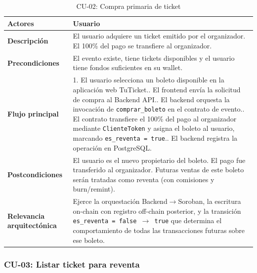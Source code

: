 \documentclass[12pt,oneside]{article}
\begin{document}
\begin{table}[h!]
  \centering
  \begin{tabularx}{\textwidth}{@{}p{3.5cm} X@{}}
    \toprule
    \textbf{Actores} & Usuario\\
    \midrule
    \textbf{Descripción} & El usuario adquiere un ticket emitido por el organizador. El 100\% del pago se transfiere al organizador.\\
    \midrule
    \textbf{Precondiciones} & El evento existe, tiene tickets disponibles y el usuario tiene fondos suficientes en su wallet.\\
    \midrule
    \textbf{Flujo principal} &
      1. El usuario selecciona un boleto disponible en la aplicación web TuTicket.\newline
      2. El frontend envía la solicitud de compra al Backend API.\newline
      3. El backend orquesta la invocación de \texttt{comprar\_boleto} en el contrato de evento.\newline
      4. El contrato transfiere el 100\% del pago al organizador mediante \texttt{ClienteToken} y asigna el boleto al usuario, marcando \texttt{es\_reventa = true}.\newline
      5. El backend registra la operación en PostgreSQL.\\
    \midrule
    \textbf{Postcondiciones} & El usuario es el nuevo propietario del boleto. El pago fue transferido al organizador. Futuras ventas de este boleto serán tratadas como reventa (con comisiones y burn/remint).\\
    \midrule
    \textbf{Relevancia arquitectónica} & Ejerce la orquestación Backend$\rightarrow$Soroban, la escritura on-chain con registro off-chain posterior, y la transición \texttt{es\_reventa = false $\rightarrow$ true} que determina el comportamiento de todas las transacciones futuras sobre ese boleto.\\
    \bottomrule
  \end{tabularx}
  \caption{CU-02: Compra primaria de ticket}
  \label{tab:cu02}
\end{table}

\clearpage
\subsubsection{CU-03: Listar ticket para reventa}
\end{document}
